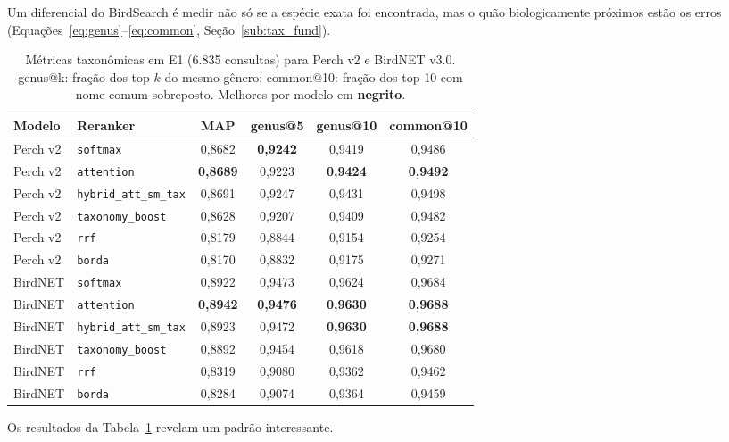\documentclass[12pt]{article}
\begin{document}
Um diferencial do BirdSearch é medir não só se a espécie exata foi encontrada,
mas o quão biologicamente próximos estão os erros
(Equações~\eqref{eq:genus}--\eqref{eq:common}, Seção~\ref{sub:tax_fund}).

\begin{table}[ht]
\centering
\caption{Métricas taxonômicas em E1 (6.835 consultas) para Perch v2 e BirdNET v3.0.
genus@k: fração dos top-$k$ do mesmo gênero; common@10: fração dos top-10
com nome comum sobreposto. Melhores por modelo em \textbf{negrito}.}
\label{tab:tax}
\begin{tabular}{llcccc}
\toprule
\textbf{Modelo} & \textbf{Reranker} & \textbf{MAP} & \textbf{genus@5} & \textbf{genus@10} & \textbf{common@10} \\
\midrule
Perch v2 & \texttt{softmax}              & 0,8682 & \textbf{0,9242} & 0,9419 & 0,9486 \\
Perch v2 & \texttt{attention}            & \textbf{0,8689} & 0,9223 & \textbf{0,9424} & \textbf{0,9492} \\
Perch v2 & \texttt{hybrid\_att\_sm\_tax} & 0,8691 & 0,9247 & 0,9431 & 0,9498 \\
Perch v2 & \texttt{taxonomy\_boost}      & 0,8628 & 0,9207 & 0,9409 & 0,9482 \\
Perch v2 & \texttt{rrf}                  & 0,8179 & 0,8844 & 0,9154 & 0,9254 \\
Perch v2 & \texttt{borda}                & 0,8170 & 0,8832 & 0,9175 & 0,9271 \\
\midrule
BirdNET  & \texttt{softmax}              & 0,8922 & 0,9473 & 0,9624 & 0,9684 \\
BirdNET  & \texttt{attention}            & \textbf{0,8942} & \textbf{0,9476} & \textbf{0,9630} & \textbf{0,9688} \\
BirdNET  & \texttt{hybrid\_att\_sm\_tax} & 0,8923 & 0,9472 & \textbf{0,9630} & \textbf{0,9688} \\
BirdNET  & \texttt{taxonomy\_boost}      & 0,8892 & 0,9454 & 0,9618 & 0,9680 \\
BirdNET  & \texttt{rrf}                  & 0,8319 & 0,9080 & 0,9362 & 0,9462 \\
BirdNET  & \texttt{borda}                & 0,8284 & 0,9074 & 0,9364 & 0,9459 \\
\bottomrule
\end{tabular}
\end{table}

Os resultados da Tabela~\ref{tab:tax} revelam um padrão interessante.
\end{document}
